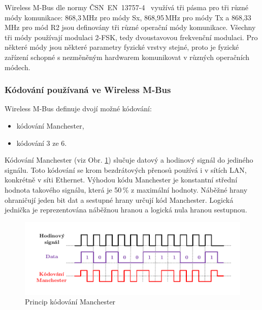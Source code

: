 Wireless M-Bus dle normy ČSN~EN~13757-4~\cite{Norma4} využívá tři pásma pro tři různé módy komunikace: 868,3\,MHz pro módy Sx, 868,95\,MHz pro módy Tx a 868,33\,MHz pro mód R2 jsou definovány tři různé operační módy komunikace. Všechny tři módy používají modulaci 2-FSK, tedy dvoustavovou frekvenční modulaci. Pro některé módy jsou některé parametry fyzické vrstvy stejné, proto je fyzické zařízení schopné s nezměněným hardwarem komunikovat v různých operačních módech.


\subsubsection{Kódování používaná ve Wireless M-Bus}
Wireless M-Bus definuje dvojí možné kódování: 
\begin{itemize}
	\item kódování Manchester,
	\item kódování 3 ze 6. 
\end{itemize}

Kódování Manchester (viz Obr. \ref{ObrazekManechester}) slučuje datový a hodinový signál do jediného signálu. Toto kódování se krom bezdrátových přenosů používá i v sítích LAN, konkrétně v síti Ethernet. Výhodou kódu Manchester je konstantní střední hodnota takového signálu, která je 50\,\% z maximální hodnoty. Náběžné hrany ohraničují jeden bit dat a sestupné hrany určují kód Manchester. Logická jednička je reprezentována náběžnou hranou a logická nula hranou sestupnou. 

				\begin{figure}[!ht]
				\vspace{-20pt}
 \begin{center}
    \includegraphics[scale=1.0]{obrazky/wmbus_manchester}
  \end{center}
	\vspace{-40pt}
  \caption{Princip kódování Manchester}
	\label{ObrazekManechester}
	\vspace{-10pt}
\end{figure}


